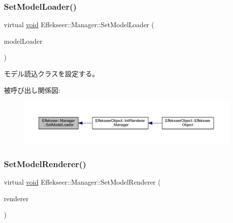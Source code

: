 \subsubsection{\texorpdfstring{Set\+Model\+Loader()}{SetModelLoader()}}
{\footnotesize\ttfamily virtual \mbox{\hyperlink{namespace_effekseer_ab34c4088e512200cf4c2716f168deb56}{void}} Effekseer\+::\+Manager\+::\+Set\+Model\+Loader (\begin{DoxyParamCaption}\item[{\mbox{\hyperlink{class_effekseer_1_1_model_loader}{Model\+Loader}} $\ast$}]{model\+Loader }\end{DoxyParamCaption})\hspace{0.3cm}{\ttfamily [pure virtual]}}



モデル読込クラスを設定する。 

被呼び出し関係図\+:\nopagebreak
\begin{figure}[H]
\begin{center}
\leavevmode
\includegraphics[width=350pt]{class_effekseer_1_1_manager_a994104b9b353a09861d27ec87b09fa1c_icgraph}
\end{center}
\end{figure}
\mbox{\label{class_effekseer_1_1_manager_aa423ee424d0b713ac4939fc7faf39b9c}} 
\subsubsection{\texorpdfstring{Set\+Model\+Renderer()}{SetModelRenderer()}}
{\footnotesize\ttfamily virtual \mbox{\hyperlink{namespace_effekseer_ab34c4088e512200cf4c2716f168deb56}{void}} Effekseer\+::\+Manager\+::\+Set\+Model\+Renderer (\begin{DoxyParamCaption}\item[{\mbox{\hyperlink{class_effekseer_1_1_model_renderer}{Model\+Renderer}} $\ast$}]{renderer }\end{DoxyParamCaption})\hspace{0.3cm}{\ttfamily [pure virtual]}}



